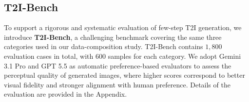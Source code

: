 \documentclass{llmxive}
\begin{document}
\subsection{T2I-Bench}
\label{sec:exp_setup}
To support a rigorous and systematic evaluation of few-step T2I generation, we introduce \textbf{T2I-Bench}, a challenging benchmark covering the same three categories used in our data-composition study. T2I-Bench contains $1{,}800$ evaluation cases in total, with $600$ samples for each category. We adopt Gemini 3.1 Pro and GPT 5.5 as automatic preference-based evaluators to assess the perceptual quality of generated images, where higher scores correspond to better visual fidelity and stronger alignment with human preference. Details of the evaluation are provided in the Appendix.
\end{document}
